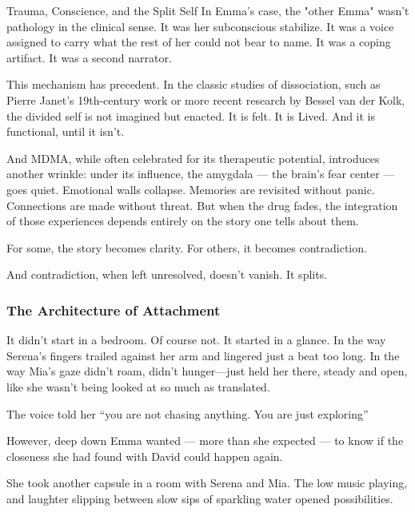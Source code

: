 \begin{PsychologicalSidebar}{Trauma, Conscience, and the Split Self}
In Emma’s case, the "other Emma" wasn’t pathology in the clinical sense. It was her subconscious 
stabilize. It was a voice assigned to carry what the rest of her could not bear to name. It was a coping 
artifact. It was a second narrator.

\medskip


This mechanism has precedent. In the classic studies of dissociation, such as Pierre Janet’s 19th-century 
work or more recent research by Bessel van der Kolk, the divided self is not imagined but enacted. It 
is felt. It is Lived. And it is functional, until it isn’t.

\medskip


And MDMA, while often celebrated for its therapeutic potential, introduces another wrinkle: under 
its influence, the amygdala --- the brain’s fear center --- goes quiet. Emotional walls collapse. 
Memories are revisited without panic. Connections are made without threat. But when the drug fades, 
the integration of those experiences depends entirely on the story one tells about them.

\medskip


For some, the story becomes clarity. For others, it becomes contradiction.

\medskip


And contradiction, when left unresolved, doesn’t vanish. It splits.

\end{PsychologicalSidebar}

\medskip



\subsubsection{The Architecture of Attachment}



It didn’t start in a bedroom.
Of course not.
It started in a glance. In the way Serena’s fingers trailed against her arm and lingered just a 
beat too long.
In the way Mia’s gaze didn’t roam, didn’t hunger—just held her there, steady and open, 
like she wasn’t being looked at so much as translated.

The voice told her ``you are not chasing anything. You are just exploring''

However, deep down Emma wanted --- more than she expected --- to know 
if the closeness she had found with David could happen again.

She took another capsule in a room with Serena and Mia. The low music playing, and laughter 
slipping between slow sips of sparkling water opened possibilities.

